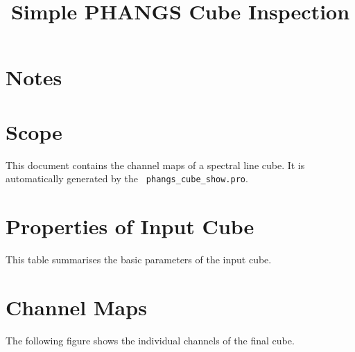 \documentclass[11pt]{article}
\begin{document}
\title{Simple PHANGS Cube Inspection}

\maketitle


\section{Notes}
\label{sect:notes}


\section{Scope}
\label{sec:scope}

\noindent This document contains the channel maps of a spectral
line cube. It is automatically generated by the {\tt
  phangs\_cube\_show.pro}.

\section{Properties of Input Cube}
\label{sect:input_cube}
\noindent This table summarises the basic parameters of the input cube.


\section{Channel Maps}
\label{sect:channel_maps}

\noindent The following figure shows the individual channels of the final cube.\\

\end{document}
